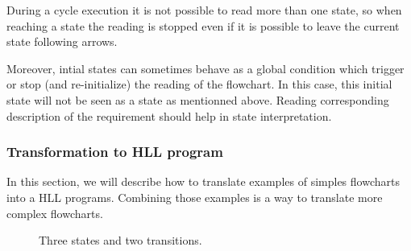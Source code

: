 During a cycle execution it is not possible to read more than one
state, so when reaching a state the reading is stopped even if it is
possible to leave the current state following arrows. 

Moreover, intial states can sometimes behave as a global condition
which trigger or stop (and re-initialize) the reading of the
flowchart. In this case, this initial state will not be seen as a
state as mentionned above. Reading corresponding description of the
requirement should help in state interpretation.


\subsubsection{Transformation to HLL program}
\label{transformation-to-hll-program}
In this section, we will describe how to translate examples of simples
flowcharts into a HLL programs. Combining those examples is a way to
translate more complex flowcharts. 

\begin{figure}[h]
\centering
{}
\caption{Three states and two transitions.}
\label{example-1}
\end{figure}


